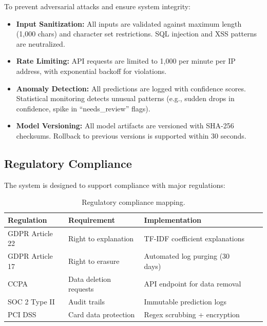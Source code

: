 \documentclass[12pt,a4paper]{article}
\renewcommand{\arraystretch}{1.5}
\newcommand{\goldrowcolors}{%
    \rowcolors{2}{bgCard}{bgDark}%
}
\newcommand{\tableheader}[1]{\textcolor{accentGold}{\textbf{#1}}}
\newcommand{\tablehdrrow}{\rowcolor{accentCard}}
\begin{document}
To prevent adversarial attacks and ensure system integrity:

\begin{itemize}[leftmargin=*]
    \item \textbf{Input Sanitization:} All inputs are validated against maximum length (1,000 chars) and character set restrictions. SQL injection and XSS patterns are neutralized.
    \item \textbf{Rate Limiting:} API requests are limited to 1,000 per minute per IP address, with exponential backoff for violations.
    \item \textbf{Anomaly Detection:} All predictions are logged with confidence scores. Statistical monitoring detects unusual patterns (e.g., sudden drops in confidence, spike in ``needs\_review'' flags).
    \item \textbf{Model Versioning:} All model artifacts are versioned with SHA-256 checksums. Rollback to previous versions is supported within 30 seconds.
\end{itemize}

\subsection{Regulatory Compliance}
\label{subsec:compliance}

The system is designed to support compliance with major regulations:

\begin{table}[H]
\centering
\goldrowcolors
\renewcommand{\arraystretch}{1.5}
\begin{tabular}{@{}L{3cm} V L{5cm} V L{5cm}@{}}
\toprule
\tablehdrrow
\tableheader{Regulation} & \tableheader{Requirement} & \tableheader{Implementation} \\
\midrule
GDPR Article 22 & Right to explanation & TF-IDF coefficient explanations \\
GDPR Article 17 & Right to erasure & Automated log purging (30 days) \\
CCPA & Data deletion requests & API endpoint for data removal \\
SOC 2 Type II & Audit trails & Immutable prediction logs \\
PCI DSS & Card data protection & Regex scrubbing + encryption \\
\bottomrule
\end{tabular}
\caption{Regulatory compliance mapping.}
\label{tab:compliance}
\end{table}
\end{document}
